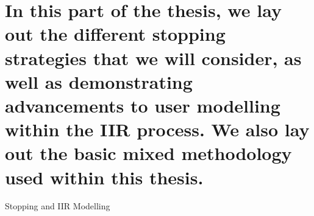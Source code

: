 
\part[Stopping and IIR Modelling]{In this part of the thesis, we lay out the different stopping strategies that we will consider, as well as demonstrating advancements to user modelling within the IIR process. We also lay out the basic mixed methodology used within this thesis.}{Stopping and IIR Modelling}\label{part:stopping}